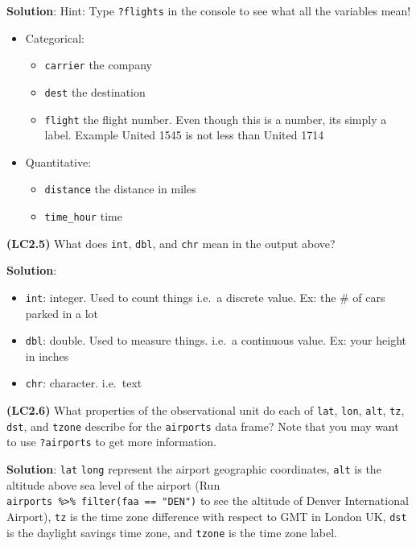\documentclass[12pt, krantz2,]{krantz}
\providecommand{\tightlist}{%
  \setlength{\itemsep}{0pt}\setlength{\parskip}{0pt}}
\begin{document}
\textbf{Solution}: Hint: Type \texttt{?flights} in the console to see what all the variables mean!

\begin{itemize}
\tightlist
\item
  Categorical:

  \begin{itemize}
  \tightlist
  \item
    \texttt{carrier} the company
  \item
    \texttt{dest} the destination
  \item
    \texttt{flight} the flight number. Even though this is a number, its simply a label. Example United 1545 is not less than United 1714
  \end{itemize}
\item
  Quantitative:

  \begin{itemize}
  \tightlist
  \item
    \texttt{distance} the distance in miles
  \item
    \texttt{time\_hour} time
  \end{itemize}
\end{itemize}

\textbf{(LC2.5)} What does \texttt{int}, \texttt{dbl}, and \texttt{chr} mean in the output above?

\textbf{Solution}:

\begin{itemize}
\tightlist
\item
  \texttt{int}: integer. Used to count things i.e.~a discrete value. Ex: the \# of cars parked in a lot
\item
  \texttt{dbl}: double. Used to measure things. i.e.~a continuous value. Ex: your height in inches
\item
  \texttt{chr}: character. i.e.~text
\end{itemize}

\textbf{(LC2.6)} What properties of the observational unit do each of \texttt{lat}, \texttt{lon}, \texttt{alt}, \texttt{tz}, \texttt{dst}, and \texttt{tzone} describe for the \texttt{airports} data frame? Note that you may want to use \texttt{?airports} to get more information.

\textbf{Solution}: \texttt{lat} \texttt{long} represent the airport geographic coordinates, \texttt{alt} is the altitude above sea level of the airport (Run \texttt{airports\ \%\textgreater{}\%\ filter(faa\ ==\ "DEN")} to see the altitude of Denver International Airport), \texttt{tz} is the time zone difference with respect to GMT in London UK, \texttt{dst} is the daylight savings time zone, and \texttt{tzone} is the time zone label.
\end{document}
